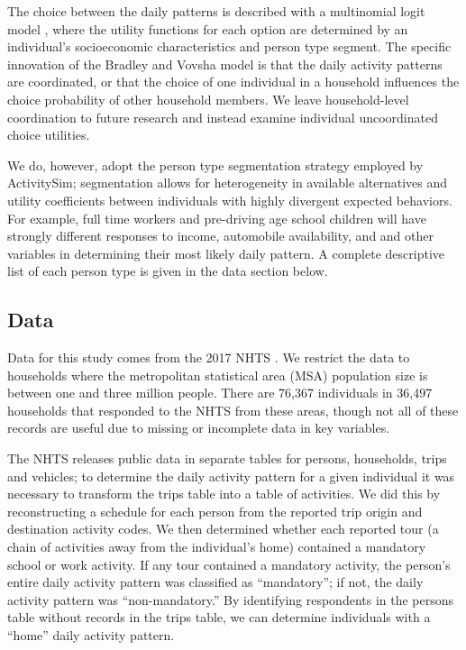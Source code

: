 \documentclass[3p, authoryear, review]{elsarticle} %
\begin{document}
The choice between the daily patterns is described with a multinomial logit
model \citet{Domencich1975}, where the utility functions for each option are
determined by an individual's socioeconomic characteristics and person type
segment. The specific innovation of the Bradley and Vovsha model
\citet{Bradley2005} is that the daily activity patterns are coordinated, or that
the choice of one individual in a household influences the choice probability of
other household members. We leave household-level coordination to future
research and instead examine individual uncoordinated choice utilities.

We do, however, adopt the person type segmentation strategy employed by
ActivitySim; segmentation allows for heterogeneity in available
alternatives and utility coefficients between individuals with highly divergent
expected behaviors. For example, full time workers and pre-driving age school children
will have strongly different responses to income, automobile availability, and
and other variables in determining their most likely daily pattern.
A complete descriptive list of each person type is given in the data
section below.

\hypertarget{data}{%
\subsection{Data}\label{data}}

Data for this study comes from the 2017 NHTS \citet{nhts2017}. We restrict the
data to households where the metropolitan statistical area (MSA) population size
is between one and three million people. There are 76,367 individuals in 36,497
households that responded to the NHTS from these areas, though not all of these
records are useful due to missing or incomplete data in key variables.

The NHTS releases public data in separate tables for persons, households,
trips and vehicles; to determine the daily activity pattern for a given
individual it was necessary to transform the trips table into a table of
activities. We did this by reconstructing a schedule for each person from the
reported trip origin and destination activity codes. We then determined whether
each reported tour (a chain of activities away from the individual's home)
contained a mandatory school or work activity. If any tour contained a mandatory
activity, the person's entire daily activity pattern was classified as ``mandatory'';
if not, the daily activity pattern was ``non-mandatory.'' By identifying respondents
in the persons table without records in the trips table, we can determine
individuals with a ``home'' daily activity pattern.
\end{document}
